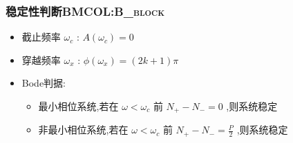 \documentclass[table]{article}
\begin{document}
\subsubsection[稳定性判断]{稳定性判断\hfill{}\textsc{BMCOL:B\_block}}
\label{sec:org3326e55}
\begin{itemize}
\item 截止频率 \(\omega_c\) : \(A(\omega_c)=0\)
\item 穿越频率 \(\omega_x\) : \(\phi(\omega_x)=(2k+1)\pi\)
\item <3->Bode判据:
\begin{itemize}
\item 最小相位系统,若在 \(\omega<\omega_c\) 前 \(N_+-N_-=0\) ,则系统稳定
\item 非最小相位系统,若在 \(\omega<\omega_c\) 前 \(N_+-N_-=\frac{P}{2}\) ,则系统稳定
\end{itemize}
\end{itemize}
\end{document}
